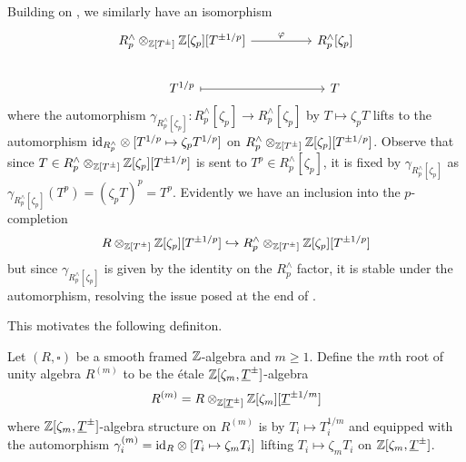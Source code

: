 \begin{example}\label{ex: endomorphism Rp with root of unity}
    Building on , we similarly have an isomorphism 
    $$%
    \begin{tikzcd}
        {R^{\wedge}_{p}\otimes_{\ZZ[T^{\pm}]}\ZZ[\zeta_{p}][T^{\pm1/p}]} && {R^{\wedge}_{p}[\zeta_{p}]} \\
        {T^{1/p}} && T
        \arrow["\varphi", from=1-1, to=1-3]
        \arrow[maps to, from=2-1, to=2-3]
    \end{tikzcd}$$
    where the automorphism $\gamma_{R_{p}^{\wedge}[\zeta_{p}]}:R_{p}^{\wedge}[\zeta_{p}]\to R_{p}^{\wedge}[\zeta_{p}]$ by $T\mapsto\zeta_{p}T$ lifts to the automorphism $\mathrm{id}_{R_{p}^{\wedge}}\otimes[T^{1/p}\mapsto\zeta_{p}T^{1/p}]$ on $R^{\wedge}_{p}\otimes_{\mathbb{Z}[T^{\pm}]}\mathbb{Z}[\zeta_{p}][T^{\pm1/p}]$. Observe that since $T\in R^{\wedge}_{p}\otimes_{\mathbb{Z}[T^{\pm}]}\mathbb{Z}[\zeta_{p}][T^{\pm1/p}]$ is sent to $T^{p}\in R_{p}^{\wedge}[\zeta_{p}]$, it is fixed by $\gamma_{R_{p}^{\wedge}[\zeta_{p}]}$ as $\gamma_{R_{p}^{\wedge}[\zeta_{p}]}(T^{p})=(\zeta_{p}T)^{p}=T^{p}$. Evidently we have an inclusion into the $p$-completion
    $$R\otimes_{\mathbb{Z}[T^{\pm}]}\mathbb{Z}[\zeta_{p}][T^{\pm 1/p}]\hookrightarrow R^{\wedge}_{p}\otimes_{\mathbb{Z}[T^{\pm}]}\mathbb{Z}[\zeta_{p}][T^{\pm1/p}]$$
    but since $\gamma_{R_{p}^{\wedge}[\zeta_{p}]}$ is given by the identity on the $R^{\wedge}_{p}$ factor, it is stable under the automorphism, resolving the issue posed at the end of . 
\end{example}
This motivates the following definiton. 
\newpage
\begin{definition}\label{def: root of unity algebra}
    Let $(R,\square)$ be a smooth framed $\mathbb{Z}$-algebra and $m\geq 1$. Define the $m$th root of unity algebra $R^{(m)}$ to be the \'{e}tale $\mathbb{Z}[\zeta_{m},\underline{T}^{\pm}]$-algebra 
    $$R^{(m)}=R\otimes_{\mathbb{Z}[\underline{T}^{\pm}]}\mathbb{Z}[\zeta_{m}][\underline{T}^{\pm 1/m}]$$ 
    where $\mathbb{Z}[\zeta_{m},\underline{T}^{\pm}]$-algebra structure on $R^{(m)}$ is by $T_{i}\mapsto T_{i}^{1/m}$ and equipped with the automorphism $\gamma^{(m)}_{i}=\mathrm{id}_{R}\otimes[T_{i}\mapsto \zeta_{m}T_{i}]$ lifting $T_{i}\mapsto\zeta_{m}T_{i}$ on $\mathbb{Z}[\zeta_{m},\underline{T}^{\pm}]$. 
\end{definition}
